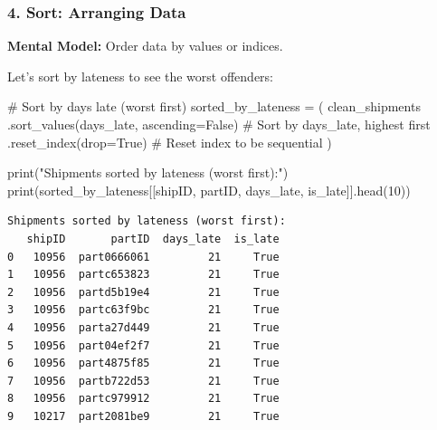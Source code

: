 \documentclass[
]{article}
\newenvironment{Shaded}{\begin{snugshade}}{\end{snugshade}}
\newcommand{\BuiltInTok}[1]{\textcolor[rgb]{0.00,0.23,0.31}{#1}}
\newcommand{\CommentTok}[1]{\textcolor[rgb]{0.37,0.37,0.37}{#1}}
\newcommand{\DecValTok}[1]{\textcolor[rgb]{0.68,0.00,0.00}{#1}}
\newcommand{\NormalTok}[1]{\textcolor[rgb]{0.00,0.23,0.31}{#1}}
\newcommand{\OperatorTok}[1]{\textcolor[rgb]{0.37,0.37,0.37}{#1}}
\newcommand{\StringTok}[1]{\textcolor[rgb]{0.13,0.47,0.30}{#1}}
\newcommand{\VariableTok}[1]{\textcolor[rgb]{0.07,0.07,0.07}{#1}}
\begin{document}
\subsubsection{4. Sort: Arranging Data}\label{sort-arranging-data}

\textbf{Mental Model:} Order data by values or indices.

Let's sort by lateness to see the worst offenders:

\label{mental-model-4-sort}
\begin{Shaded}
\begin{Highlighting}[]
\CommentTok{\# Sort by days late (worst first)}
\NormalTok{sorted\_by\_lateness }\OperatorTok{=}\NormalTok{ (}
\NormalTok{    clean\_shipments}
\NormalTok{    .sort\_values(}\StringTok{\textquotesingle{}days\_late\textquotesingle{}}\NormalTok{, ascending}\OperatorTok{=}\VariableTok{False}\NormalTok{)  }\CommentTok{\# Sort by days\_late, highest first}
\NormalTok{    .reset\_index(drop}\OperatorTok{=}\VariableTok{True}\NormalTok{)  }\CommentTok{\# Reset index to be sequential}
\NormalTok{)}

\BuiltInTok{print}\NormalTok{(}\StringTok{"Shipments sorted by lateness (worst first):"}\NormalTok{)}
\BuiltInTok{print}\NormalTok{(sorted\_by\_lateness[[}\StringTok{\textquotesingle{}shipID\textquotesingle{}}\NormalTok{, }\StringTok{\textquotesingle{}partID\textquotesingle{}}\NormalTok{, }\StringTok{\textquotesingle{}days\_late\textquotesingle{}}\NormalTok{, }\StringTok{\textquotesingle{}is\_late\textquotesingle{}}\NormalTok{]].head(}\DecValTok{10}\NormalTok{))}
\end{Highlighting}
\end{Shaded}

\begin{verbatim}
Shipments sorted by lateness (worst first):
   shipID       partID  days_late  is_late
0   10956  part0666061         21     True
1   10956  partc653823         21     True
2   10956  partd5b19e4         21     True
3   10956  partc63f9bc         21     True
4   10956  parta27d449         21     True
5   10956  part04ef2f7         21     True
6   10956  part4875f85         21     True
7   10956  partb722d53         21     True
8   10956  partc979912         21     True
9   10217  part2081be9         21     True
\end{verbatim}
\end{document}
